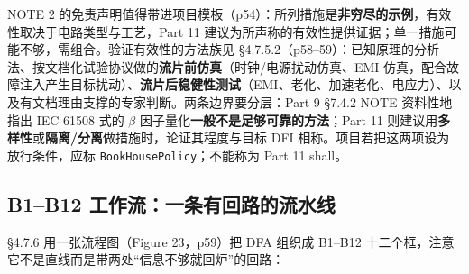 NOTE 2 的免责声明值得带进项目模板（p54）：所列措施是\textbf{非穷尽的示例}，有效性取决于电路类型与工艺，Part 11 建议为所声称的有效性提供证据；单一措施可能不够，需组合。验证有效性的方法族见 §4.7.5.2（p58–59）：已知原理的分析法、按文档化试验协议做的\textbf{流片前仿真}（时钟/电源扰动仿真、EMI 仿真，配合故障注入产生目标扰动）、\textbf{流片后稳健性测试}（EMI、老化、加速老化、电应力）、以及有文档理由支撑的专家判断。两条边界要分层：Part 9 §7.4.2 NOTE 资料性地指出 IEC 61508 式的 \(\beta\) 因子量化\textbf{一般不是足够可靠的方法}；Part 11 则建议用\textbf{多样性}或\textbf{隔离/分离}做措施时，论证其程度与目标 DFI 相称。项目若把这两项设为放行条件，应标 \nolinkurl{BookHousePolicy}；不能称为 Part 11 shall。

\subsection{B1–B12 工作流：一条有回路的流水线}

§4.7.6 用一张流程图（Figure 23，p59）把 DFA 组织成 B1–B12 十二个框，注意它不是直线而是带两处“信息不够就回炉”的回路：

